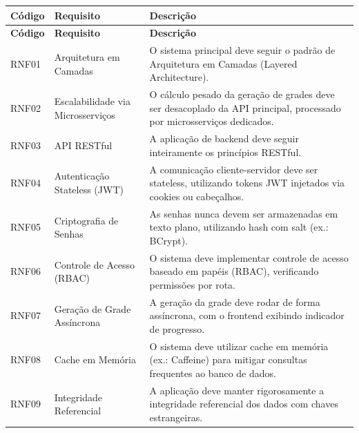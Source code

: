 \begin{longtable}{|C{1.8cm}|L{4.5cm}|L{7.1cm}|}
\hline
\textbf{Código} & \textbf{Requisito} & \textbf{Descrição} \\
\hline
\endfirsthead
\hline
\textbf{Código} & \textbf{Requisito} & \textbf{Descrição} \\
\hline
\endhead
RNF01 & Arquitetura em Camadas & O sistema principal deve seguir o padrão de Arquitetura em Camadas (Layered Architecture). \\
\hline
RNF02 & Escalabilidade via Microsserviços & O cálculo pesado da geração de grades deve ser desacoplado da API principal, processado por microsserviços dedicados. \\
\hline
RNF03 & API RESTful & A aplicação de backend deve seguir inteiramente os princípios RESTful. \\
\hline
RNF04 & Autenticação Stateless (JWT) & A comunicação cliente-servidor deve ser stateless, utilizando tokens JWT injetados via cookies ou cabeçalhos. \\
\hline
RNF05 & Criptografia de Senhas & As senhas nunca devem ser armazenadas em texto plano, utilizando hash com salt (ex.: BCrypt). \\
\hline
RNF06 & Controle de Acesso (RBAC) & O sistema deve implementar controle de acesso baseado em papéis (RBAC), verificando permissões por rota. \\
\hline
RNF07 & Geração de Grade Assíncrona & A geração da grade deve rodar de forma assíncrona, com o frontend exibindo indicador de progresso. \\
\hline
RNF08 & Cache em Memória & O sistema deve utilizar cache em memória (ex.: Caffeine) para mitigar consultas frequentes ao banco de dados. \\
\hline
RNF09 & Integridade Referencial & A aplicação deve manter rigorosamente a integridade referencial dos dados com chaves estrangeiras. \\
\hline
\end{longtable}


